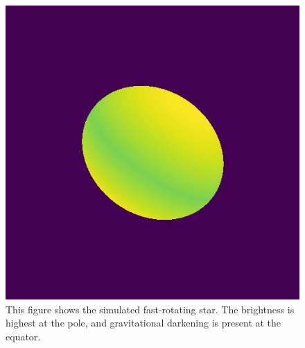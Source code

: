 \begin{figure}
	\centering
	\includegraphics[width=0.8\linewidth]{fig/ellipse/ellipse6018.jpg}
	\caption{This figure shows the simulated fast-rotating star. The brightness is highest at the pole, and gravitational darkening is present at the equator.}
	\label{fig:image}
\end{figure}

